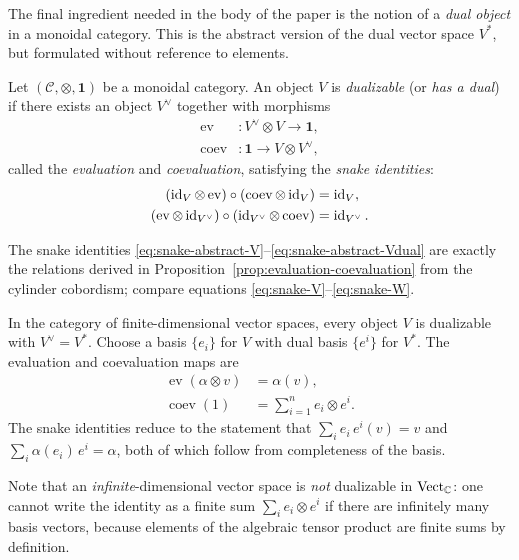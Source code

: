 The final ingredient needed in the body of the paper is the notion of a \emph{dual object} in a monoidal category.  This is the abstract version of the dual vector space $V^*$, but formulated without reference to elements.

\begin{definition}\label{def:dualizable}
Let $(\mathcal{C}, \otimes, \mathbf{1})$ be a monoidal category.  An object $V$ is \emph{dualizable} (or \emph{has a dual}) if there exists an object $V^\vee$ together with morphisms
\begin{align}
\operatorname{ev} &: V^\vee \otimes V \longrightarrow \mathbf{1}, \label{eq:evaluation-abstract} \\
\operatorname{coev} &: \mathbf{1} \longrightarrow V \otimes V^\vee, \label{eq:coevaluation-abstract}
\end{align}
called the \emph{evaluation} and \emph{coevaluation}, satisfying the \emph{snake identities}:
\begin{align}
(\operatorname{id}_V \otimes \operatorname{ev}) \circ (\operatorname{coev} \otimes \operatorname{id}_V) &= \operatorname{id}_V, \label{eq:snake-abstract-V} \\
(\operatorname{ev} \otimes \operatorname{id}_{V^\vee}) \circ (\operatorname{id}_{V^\vee} \otimes \operatorname{coev}) &= \operatorname{id}_{V^\vee}. \label{eq:snake-abstract-Vdual}
\end{align}
\end{definition}

\noindent The snake identities \eqref{eq:snake-abstract-V}--\eqref{eq:snake-abstract-Vdual} are exactly the relations derived in Proposition~\ref{prop:evaluation-coevaluation} from the cylinder cobordism; compare equations \eqref{eq:snake-V}--\eqref{eq:snake-W}.

\begin{example}\label{ex:duals-Vect}
In the category of finite-dimensional vector spaces, every object $V$ is dualizable with $V^\vee = V^*$.  Choose a basis $\{e_i\}$ for $V$ with dual basis $\{e^i\}$ for $V^*$.  The evaluation and coevaluation maps are
\begin{align}
\operatorname{ev}(\alpha \otimes v) &= \alpha(v), \label{eq:ev-Vect} \\
\operatorname{coev}(1) &= \sum_{i=1}^n e_i \otimes e^i. \label{eq:coev-Vect}
\end{align}
The snake identities reduce to the statement that $\sum_i e_i \, e^i(v) = v$ and $\sum_i \alpha(e_i) \, e^i = \alpha$, both of which follow from completeness of the basis.

Note that an \emph{infinite}-dimensional vector space is \emph{not} dualizable in $\mathrm{Vect}_{\mathbb{C}}$: one cannot write the identity as a finite sum $\sum_i e_i \otimes e^i$ if there are infinitely many basis vectors, because elements of the algebraic tensor product are finite sums by definition.
\end{example}

